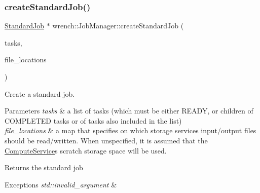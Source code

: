 \subsubsection{\texorpdfstring{create\+Standard\+Job()}{createStandardJob()}\hspace{0.1cm}{\footnotesize\ttfamily [2/3]}}
{\footnotesize\ttfamily \hyperlink{classwrench_1_1_standard_job}{Standard\+Job} $\ast$ wrench\+::\+Job\+Manager\+::create\+Standard\+Job (\begin{DoxyParamCaption}\item[{std\+::vector$<$ \hyperlink{classwrench_1_1_workflow_task}{Workflow\+Task} $\ast$$>$}]{tasks,  }\item[{std\+::map$<$ \hyperlink{classwrench_1_1_workflow_file}{Workflow\+File} $\ast$, \hyperlink{classwrench_1_1_storage_service}{Storage\+Service} $\ast$$>$}]{file\+\_\+locations }\end{DoxyParamCaption})}



Create a standard job. 


\begin{DoxyParams}{Parameters}
{\em tasks} & a list of tasks (which must be either R\+E\+A\+DY, or children of C\+O\+M\+P\+L\+E\+T\+ED tasks or of tasks also included in the list) \\
\hline
{\em file\+\_\+locations} & a map that specifies on which storage services input/output files should be read/written. When unspecified, it is assumed that the \hyperlink{classwrench_1_1_compute_service}{Compute\+Service}\textquotesingle{}s scratch storage space will be used.\\
\hline
\end{DoxyParams}
\begin{DoxyReturn}{Returns}
the standard job
\end{DoxyReturn}

\begin{DoxyExceptions}{Exceptions}
{\em std\+::invalid\+\_\+argument} & \\
\hline
\end{DoxyExceptions}
\mbox{\label{classwrench_1_1_job_manager_a42271d359373df86fdb59aeeaf0a4abc}} 
